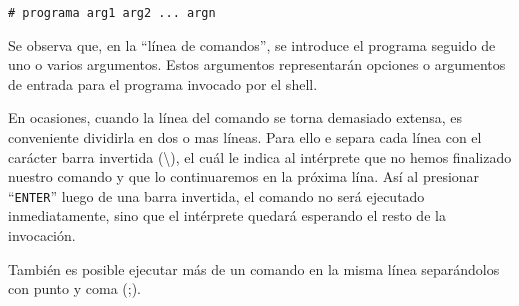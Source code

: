 \documentclass[12pt]{article}
\begin{document}
\texttt{\# programa arg1 arg2 ... argn}

Se observa que, en la ``línea de comandos'', se introduce el programa seguido de uno o varios argumentos. 
Estos argumentos representarán opciones o argumentos de entrada para el programa invocado por el shell. 


En ocasiones, cuando la línea del comando se torna demasiado extensa, es conveniente dividirla
en dos o mas líneas. Para ello e separa cada línea con el carácter barra invertida (\textbackslash), 
el cuál le indica al intérprete que no hemos finalizado nuestro comando y que lo continuaremos 
en la próxima lína. Así al presionar ``\texttt{ENTER}'' luego de una barra invertida, el comando 
no será ejecutado inmediatamente, sino que el intérprete quedará esperando el resto de la invocación. 

También es posible ejecutar más de un comando en la misma línea separándolos con punto y coma (;). 

\end{document}
